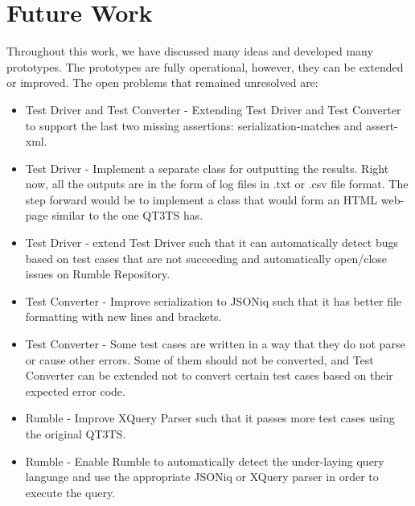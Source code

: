 \section{Future Work}
Throughout this work, we have discussed many ideas and developed many prototypes. The prototypes are fully operational, however, they can be extended or improved. The open problems that remained unresolved are:
\begin{itemize}
	\item Test Driver and Test Converter - Extending Test Driver and Test Converter to support the last two missing assertions: serialization-matches and assert-xml.
	\item Test Driver - Implement a separate class for outputting the results. Right now, all the outputs are in the form of log files in .txt or .csv file format. The step forward would be to implement a class that would form an HTML web-page similar to the one QT3TS has.
	\item Test Driver - extend Test Driver such that it can automatically detect bugs based on test cases that are not succeeding and automatically open/close issues on Rumble Repository.
	\item Test Converter - Improve serialization to JSONiq such that it has better file formatting with new lines and brackets.
	\item Test Converter - Some test cases are written in a way that they do not parse or cause other errors. Some of them should not be converted, and Test Converter can be extended not to convert certain test cases based on their expected error code.
	\item Rumble - Improve XQuery Parser such that it passes more test cases using the original QT3TS.
	\item Rumble - Enable Rumble to automatically detect the under-laying query language and use the appropriate JSONiq or XQuery parser in order to execute the query. 
\end{itemize}